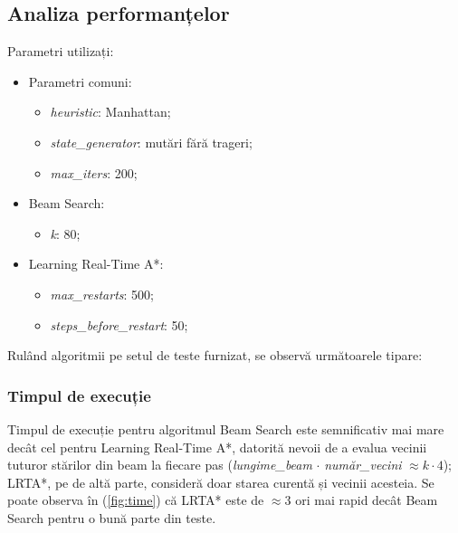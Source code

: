 \documentclass{article}
\begin{document}
\subsection{Analiza performanțelor}\label{sec:performances}

Parametri utilizați:
\begin{itemize}
    \item Parametri comuni:
    \begin{itemize}
        \item \textit{heuristic}: Manhattan;
        \item \textit{state\_generator}: mutări fără trageri;
        \item \textit{max\_iters}: 200;
    \end{itemize}
    \item Beam Search:
    \begin{itemize}
        \item \textit{k}: 80;
    \end{itemize}
    \item Learning Real-Time A*:
    \begin{itemize}
        \item \textit{max\_restarts}: 500;
        \item \textit{steps\_before\_restart}: 50;
    \end{itemize}
\end{itemize}

Rulând algoritmii pe setul de teste furnizat, se observă următoarele tipare:

\subsubsection*{Timpul de execuție}
Timpul de execuție pentru algoritmul Beam Search este semnificativ mai mare
decât cel pentru Learning Real-Time A*, datorită nevoii de a evalua vecinii 
tuturor stărilor din beam la fiecare pas (\textit{lungime\_beam} $\cdot$ 
\textit{număr\_vecini} $\approx k \cdot 4$); LRTA*, pe de altă parte, consideră
doar starea curentă și vecinii acesteia. Se poate observa în (\ref{fig:time}) că
LRTA* este de $\approx 3$ ori mai rapid decât Beam Search pentru o bună parte 
din teste. 
\end{document}
